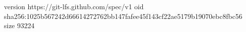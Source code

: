 version https://git-lfs.github.com/spec/v1
oid sha256:1025b567242d66614272762bb147fafee45f143cf22ae5179b19070ebc8fbc56
size 93224
